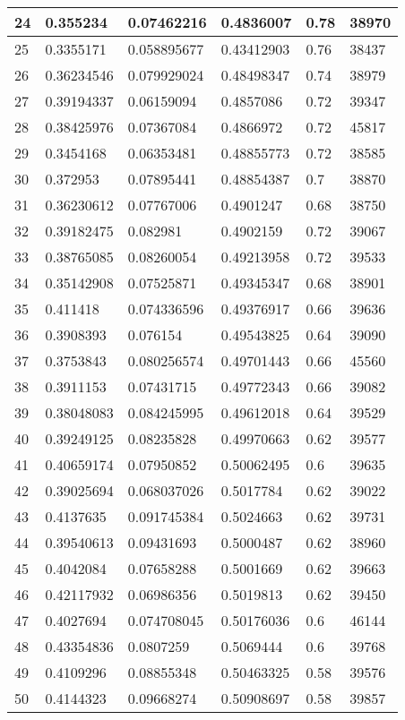 \begin{longtable}{|l|l|l|l|l|l|}
24 & 0.355234 & 0.07462216 & 0.4836007 & 0.78 & 38970 \\ \hline 
25 & 0.3355171 & 0.058895677 & 0.43412903 & 0.76 & 38437 \\ \hline 
26 & 0.36234546 & 0.079929024 & 0.48498347 & 0.74 & 38979 \\ \hline 
27 & 0.39194337 & 0.06159094 & 0.4857086 & 0.72 & 39347 \\ \hline 
28 & 0.38425976 & 0.07367084 & 0.4866972 & 0.72 & 45817 \\ \hline 
29 & 0.3454168 & 0.06353481 & 0.48855773 & 0.72 & 38585 \\ \hline 
30 & 0.372953 & 0.07895441 & 0.48854387 & 0.7 & 38870 \\ \hline 
31 & 0.36230612 & 0.07767006 & 0.4901247 & 0.68 & 38750 \\ \hline 
32 & 0.39182475 & 0.082981 & 0.4902159 & 0.72 & 39067 \\ \hline 
33 & 0.38765085 & 0.08260054 & 0.49213958 & 0.72 & 39533 \\ \hline 
34 & 0.35142908 & 0.07525871 & 0.49345347 & 0.68 & 38901 \\ \hline 
35 & 0.411418 & 0.074336596 & 0.49376917 & 0.66 & 39636 \\ \hline 
36 & 0.3908393 & 0.076154 & 0.49543825 & 0.64 & 39090 \\ \hline 
37 & 0.3753843 & 0.080256574 & 0.49701443 & 0.66 & 45560 \\ \hline 
38 & 0.3911153 & 0.07431715 & 0.49772343 & 0.66 & 39082 \\ \hline 
39 & 0.38048083 & 0.084245995 & 0.49612018 & 0.64 & 39529 \\ \hline 
40 & 0.39249125 & 0.08235828 & 0.49970663 & 0.62 & 39577 \\ \hline 
41 & 0.40659174 & 0.07950852 & 0.50062495 & 0.6 & 39635 \\ \hline 
42 & 0.39025694 & 0.068037026 & 0.5017784 & 0.62 & 39022 \\ \hline 
43 & 0.4137635 & 0.091745384 & 0.5024663 & 0.62 & 39731 \\ \hline 
44 & 0.39540613 & 0.09431693 & 0.5000487 & 0.62 & 38960 \\ \hline 
45 & 0.4042084 & 0.07658288 & 0.5001669 & 0.62 & 39663 \\ \hline 
46 & 0.42117932 & 0.06986356 & 0.5019813 & 0.62 & 39450 \\ \hline 
47 & 0.4027694 & 0.074708045 & 0.50176036 & 0.6 & 46144 \\ \hline 
48 & 0.43354836 & 0.0807259 & 0.5069444 & 0.6 & 39768 \\ \hline 
49 & 0.4109296 & 0.08855348 & 0.50463325 & 0.58 & 39576 \\ \hline 
50 & 0.4144323 & 0.09668274 & 0.50908697 & 0.58 & 39857 \\ \hline 
\end{longtable}